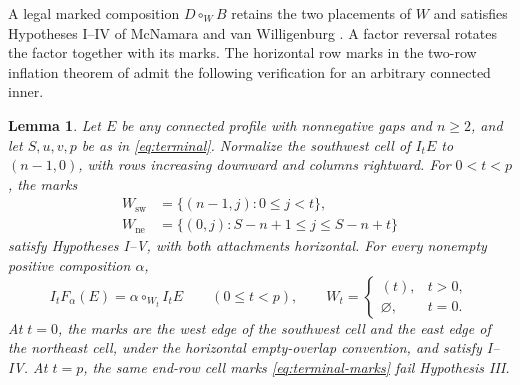 \documentclass[11pt,a4paper]{amsart}
\numberwithin{equation}{section}
\theoremstyle{plain}
\newtheorem{lemma}[theorem]{Lemma}
\theoremstyle{definition}
\begin{document}
A legal marked composition \(D\circ_W B\) retains the two placements of \(W\) and satisfies Hypotheses I--IV of McNamara and van Willigenburg \cite{McNamara2009Classification}.  A factor reversal rotates the factor together with its marks.  The horizontal row marks in the two-row inflation theorem of \cite{Shields2026Inflation} admit the following verification for an arbitrary connected inner.

\begin{lemma}\label{lem:prewall-chart}
Let \(E\) be any connected profile with nonnegative gaps and \(n\ge2\), and let \(S,u,v,p\) be as in \eqref{eq:terminal}.  Normalize the southwest cell of \(I_tE\) to \((n-1,0)\), with rows increasing downward and columns rightward.  For \(0<t<p\), the marks
\begin{equation}\label{eq:terminal-marks}
 \begin{aligned}
 W_{\mathrm{sw}}&=\{(n-1,j):0\le j<t\},\\
 W_{\mathrm{ne}}&=\{(0,j):S-n+1\le j\le S-n+t\}
 \end{aligned}
\end{equation}
satisfy Hypotheses I--V, with both attachments horizontal.  For every nonempty positive composition \(\alpha\),
\begin{equation}\label{eq:prewall-chart}
 I_tF_\alpha(E)=\alpha\circ_{W_t}I_tE\qquad(0\le t<p),
 \qquad
 W_t=\begin{cases}(t),&t>0,\\\varnothing,&t=0.\end{cases}
\end{equation}
At \(t=0\), the marks are the west edge of the southwest cell and the east edge of the northeast cell, under the horizontal empty-overlap convention, and satisfy I--IV.  At \(t=p\), the same end-row cell marks \eqref{eq:terminal-marks} fail Hypothesis III.
\end{lemma}
\end{document}
